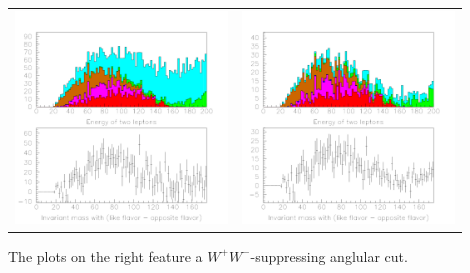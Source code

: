 \documentclass[landscape]{article}
\begin{document}
\begin{center} \begin{tabular}{p{0.45\linewidth} p{0.45\linewidth}}
    \includegraphics[width=\linewidth]{again_energy_nocut.pdf} &
    \includegraphics[width=\linewidth]{again_energy_withcut.pdf}
\end{tabular} \end{center}

\vfill

The plots on the right feature a $W^+W^-$-suppressing anglular cut.

\vfill

\mbox{ }
\end{document}
